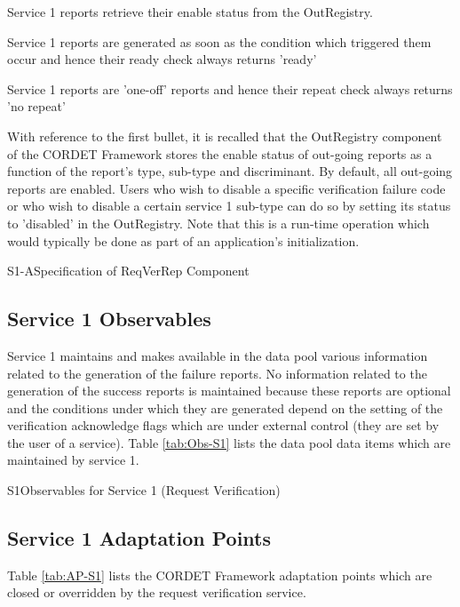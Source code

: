 \documentclass{pnp_article}
\begin{document}
\begin{fw_itemize}
\item Service 1 reports retrieve their enable status from the OutRegistry.
\item Service 1 reports are generated as soon as the condition which triggered them occur and hence their ready check always returns 'ready'
\item Service 1 reports are 'one-off' reports and hence their repeat check always returns 'no repeat'
\end{fw_itemize}

With reference to the first bullet, it is recalled that the OutRegistry component of the CORDET Framework stores the enable status of out-going reports as a function of the report's type, sub-type and discriminant. By default, all out-going reports are enabled. Users who wish to disable a specific verification failure code or who wish to disable a certain service 1 sub-type can do so by setting its status to 'disabled' in the OutRegistry. Note that this is a run-time operation which would typically be done as part of an application's initialization.

\newpage
\begin{cr_rep}{S1-A}{Specification of ReqVerRep Component}
\end{cr_rep}

\subsection{Service 1 Observables}\label{sec:serv1Obs}
Service 1 maintains and makes available in the data pool various information related to the generation of the failure reports. No information related to the generation of the success reports is maintained because these reports are optional and the conditions under which they are generated depend on the setting of the verification acknowledge flags which are under external control (they are set by the user of a service). Table \ref{tab:Obs-S1} lists the data pool data items which are maintained by service 1.

\begin{cr_obs}{S1}{Observables for Service 1 (Request Verification)}
\end{cr_obs}

\subsection{Service 1 Adaptation Points}\label{sec:serv1AP}
Table \ref{tab:AP-S1} lists the CORDET Framework adaptation points which are closed or overridden by the request verification service. 
\end{document}
